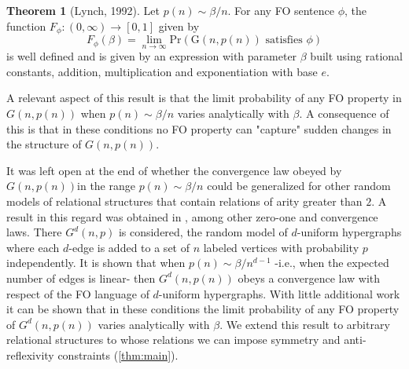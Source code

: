 \documentclass[12pt,notitlepage,a4paper]{article}
\theoremstyle{definition}
\newtheorem*{theorem*}{Theorem}
\newcommand{\Ln}{\lim\limits_{n\to \infty}}
\begin{document}
\begin{theorem*}[Lynch, 1992]
	Let $p(n)\sim \beta/n$. For any FO sentence $\phi$, the function
	$F_\phi: (0,\infty)\rightarrow [0,1]$ given by 
	\[ F_\phi(\beta) = \Ln \mathrm{Pr}\left( \mathrm{G}(n,p(n))
	\text{ satisfies } \phi   \right) \]
	is well defined and is given by an expression with parameter $\beta$ built
	using rational constants, addition, multiplication and exponentiation with base $e$.
\end{theorem*}

A relevant aspect of this result is that the limit probability of any FO
property in $G(n,p(n))$ when $p(n)\sim \beta/n$ varies analytically with $\beta$.
A consequence of this is that in these conditions no FO property can "capture" sudden changes 
in the structure of $G(n,p(n))$. \par
It was left open at the end of \cite{lynch1992probabilities} whether the convergence law obeyed
by $G(n,p(n))$in the range $p(n)\sim \beta/n$
could be generalized for other random models of relational structures 
that contain relations of arity greater than $2$.
A result in this regard was obtained in \cite{salvadorbrasil}, 
among other zero-one and convergence laws.
There $G^d(n,p)$ is considered, the random model of $d$-uniform hypergraphs where
each $d$-edge is added to a set of $n$ labeled vertices with probability $p$ independently.
It is shown that when $p(n)\sim \beta/n^{d-1}$ -i.e., when the expected number of
edges is linear- then $G^d(n,p(n))$ obeys a convergence law with respect of the FO
language of $d$-uniform hypergraphs. With little additional work it can be shown that
in these conditions the limit probability of any FO property of $G^d(n,p(n))$ varies 
analytically with $\beta$. We 
extend this result to arbitrary relational structures
to whose relations we can impose symmetry and anti-reflexivity constraints 
(\cref{thm:main}). \par
\end{document}
